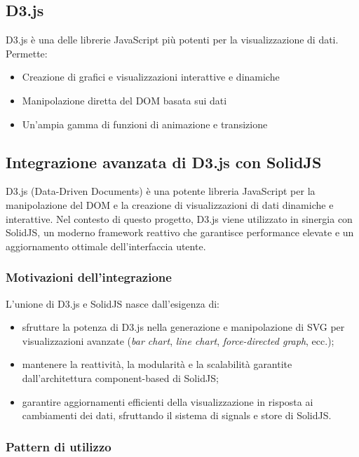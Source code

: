 \subsection{D3.js}
D3.js è una delle librerie JavaScript più potenti per la visualizzazione di dati. Permette:
\begin{itemize}
    \item Creazione di grafici e visualizzazioni interattive e dinamiche
    \item Manipolazione diretta del DOM basata sui dati
    \item Un’ampia gamma di funzioni di animazione e transizione
\end{itemize}

\subsection{Integrazione avanzata di D3.js con SolidJS}

D3.js (Data-Driven Documents) è una potente libreria JavaScript per la manipolazione del DOM e la creazione di visualizzazioni di dati dinamiche e interattive. Nel contesto di questo progetto, D3.js viene utilizzato in sinergia con SolidJS, un moderno framework reattivo che garantisce performance elevate e un aggiornamento ottimale dell’interfaccia utente.

\subsubsection{Motivazioni dell’integrazione}

L’unione di D3.js e SolidJS nasce dall’esigenza di:
\begin{itemize}
    \item sfruttare la potenza di D3.js nella generazione e manipolazione di SVG per visualizzazioni avanzate (\textit{bar chart}, \textit{line chart}, \textit{force-directed graph}, ecc.);
    \item mantenere la reattività, la modularità e la scalabilità garantite dall’architettura component-based di SolidJS;
    \item garantire aggiornamenti efficienti della visualizzazione in risposta ai cambiamenti dei dati, sfruttando il sistema di signals e store di SolidJS.
\end{itemize}

\subsubsection{Pattern di utilizzo}

